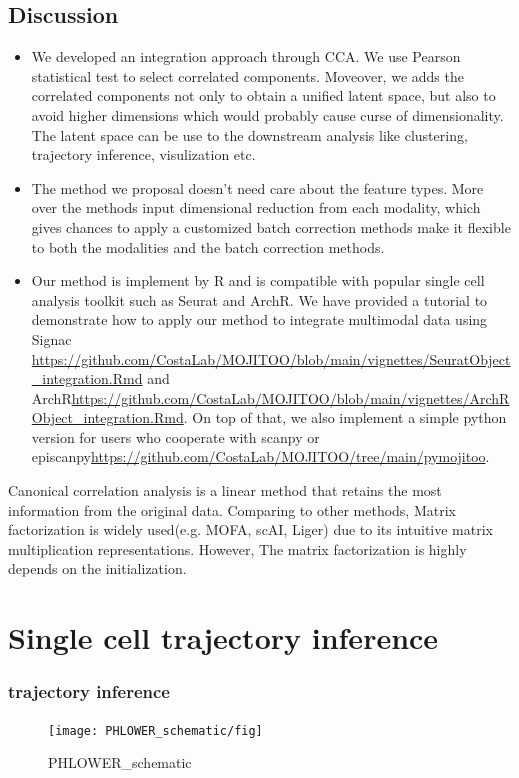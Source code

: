 \subsection{Discussion}
\begin{itemize}
    \item We developed an integration approach through CCA. We use Pearson statistical test to select correlated components. Moveover, we adds the correlated components not only to obtain a unified latent space, but also to avoid higher dimensions which would probably cause curse of dimensionality\citep{Dreyfus2003}. The latent space can be use to the downstream analysis like clustering, trajectory inference, visulization etc. 

    \item The method we proposal doesn't need care about the feature types. More over the methods input dimensional reduction from each modality, which gives chances to apply a customized batch correction methods make it flexible to both the modalities and the batch correction methods.
    
    \item Our method is implement by R and is compatible with popular single cell analysis toolkit such as Seurat and ArchR. We have provided a tutorial to demonstrate how to apply our method to integrate multimodal data using Signac \url{https://github.com/CostaLab/MOJITOO/blob/main/vignettes/SeuratObject_integration.Rmd} and ArchR\url{https://github.com/CostaLab/MOJITOO/blob/main/vignettes/ArchRObject_integration.Rmd}. On top of that, we also implement a simple python version for users who cooperate with scanpy or episcanpy\url{https://github.com/CostaLab/MOJITOO/tree/main/pymojitoo}. 
\end{itemize}

Canonical correlation analysis is a linear method that retains the most information from the original data. Comparing to other methods, Matrix factorization is widely used(e.g. MOFA, scAI, Liger) due to its intuitive matrix multiplication representations. However, The matrix factorization is highly depends on the initialization. 



\section{Single cell trajectory inference}
\label{methods:TI}

\subsubsection{trajectory inference}
\begin{figure}[!ht]
	\centering
	\texttt{[image: PHLOWER\_schematic/fig]}
	\vspace{0.1cm}
	\caption[PHLOWER\_schematic.]{PHLOWER\_schematic}
	\label{fig:PHLOWER_schematic}
\end{figure}

